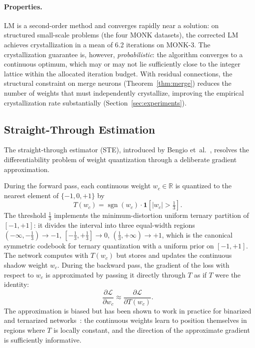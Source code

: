 \documentclass[12pt,a4paper]{article}
\begin{document}
\paragraph{Properties.}
LM is a second-order method and converges rapidly near a solution:
on structured small-scale problems (the four MONK datasets), the corrected
LM achieves crystallization in a mean of 6.2 iterations on MONK-3.
The crystallization guarantee is, however, \emph{probabilistic}: the
algorithm converges to a continuous optimum, which may or may not lie
sufficiently close to the integer lattice within the allocated iteration
budget.
With residual connections, the structural constraint on merge neurons
(Theorem~\ref{thm:merge}) reduces the number of weights that must
independently crystallize, improving the empirical crystallization rate
substantially (Section~\ref{sec:experiments}).

\subsection{Straight-Through Estimation}
\label{ssec:ste}

The straight-through estimator (STE), introduced by Bengio
et~al.~\cite{bengio2013}, resolves the differentiability problem of
weight quantization through a deliberate gradient approximation.

During the forward pass, each continuous weight $w_c \in \mathbb{R}$ is
quantized to the nearest element of $\{-1, 0, +1\}$ by
\begin{equation}
  T(w_c) = \operatorname{sgn}(w_c) \cdot \mathbf{1}\!\left[|w_c| > \tfrac{1}{3}\right].
  \label{eq:T}
\end{equation}
The threshold $\tfrac{1}{3}$ implements the minimum-distortion uniform
ternary partition of $[-1,+1]$: it divides the interval into three
equal-width regions
$(-\infty,-\tfrac{1}{3}) \to -1$,
$[-\tfrac{1}{3},+\tfrac{1}{3}] \to 0$,
$(\tfrac{1}{3},+\infty) \to +1$,
which is the canonical symmetric codebook for ternary quantization with a
uniform prior on $[-1,+1]$.
The network computes with $T(w_c)$ but stores and updates the continuous
shadow weight $w_c$.
During the backward pass, the gradient of the loss with respect to $w_c$ is
approximated by passing it directly through $T$ as if $T$ were the identity:
\begin{equation}
  \frac{\partial \mathcal{L}}{\partial w_c}
    \approx \frac{\partial \mathcal{L}}{\partial T(w_c)}.
  \label{eq:ste}
\end{equation}
The approximation is biased but has been shown to work in practice for
binarized and ternarized networks~\cite{courbariaux2016,li2016}: the
continuous weights learn to position themselves in regions where $T$ is
locally constant, and the direction of the approximate gradient is
sufficiently informative.
\end{document}

